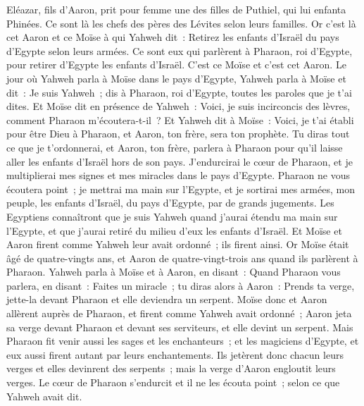 \begin{multicols}{2}
Eléazar, fils d'Aaron, prit pour femme une des filles de Puthiel, qui lui enfanta Phinées. Ce sont là les chefs des pères des Lévites selon leurs familles.
Or c'est là cet Aaron et ce Moïse à qui Yahweh dit~: Retirez les enfants d'Israël du pays d'Egypte selon leurs armées.
Ce sont eux qui parlèrent à Pharaon, roi d'Egypte, pour retirer d'Egypte les enfants d'Israël. C'est ce Moïse et c'est cet Aaron.
Le jour où Yahweh parla à Moïse dans le pays d'Egypte,
Yahweh parla à Moïse et dit~: Je suis Yahweh~; dis à Pharaon, roi d'Egypte, toutes les paroles que je t'ai dites.
Et Moïse dit en présence de Yahweh~: Voici, je suis incirconcis des lèvres, comment Pharaon m'écoutera-t-il~?
\VerseOne{}Et Yahweh dit à Moïse~: Voici, je t'ai établi pour être Dieu à Pharaon, et Aaron, ton frère, sera ton prophète.
Tu diras tout ce que je t'ordonnerai, et Aaron, ton frère, parlera à Pharaon pour qu'il laisse aller les enfants d'Israël hors de son pays.
J'endurcirai le cœur de Pharaon, et je multiplierai mes signes et mes miracles dans le pays d'Egypte.
Pharaon ne vous écoutera point~; je mettrai ma main sur l'Egypte, et je sortirai mes armées, mon peuple, les enfants d'Israël, du pays d'Egypte, par de grands jugements.
Les Egyptiens connaîtront que je suis Yahweh quand j'aurai étendu ma main sur l'Egypte, et que j'aurai retiré du milieu d'eux les enfants d'Israël.
Et Moïse et Aaron firent comme Yahweh leur avait ordonné~; ils firent ainsi.
Or Moïse était âgé de quatre-vingts ans, et Aaron de quatre-vingt-trois ans quand ils parlèrent à Pharaon.
Yahweh parla à Moïse et à Aaron, en disant~:
Quand Pharaon vous parlera, en disant~: Faites un miracle~; tu diras alors à Aaron~: Prends ta verge, jette-la devant Pharaon et elle deviendra un serpent.
Moïse donc et Aaron allèrent auprès de Pharaon, et firent comme Yahweh avait ordonné~; Aaron jeta sa verge devant Pharaon et devant ses serviteurs, et elle devint un serpent.
Mais Pharaon fit venir aussi les sages et les enchanteurs~; et les magiciens d'Egypte, et eux aussi firent autant par leurs enchantements.
Ils jetèrent donc chacun leurs verges et elles devinrent des serpents~; mais la verge d'Aaron engloutit leurs verges.
Le cœur de Pharaon s'endurcit et il ne les écouta point~; selon ce que Yahweh avait dit.

\end{multicols}

